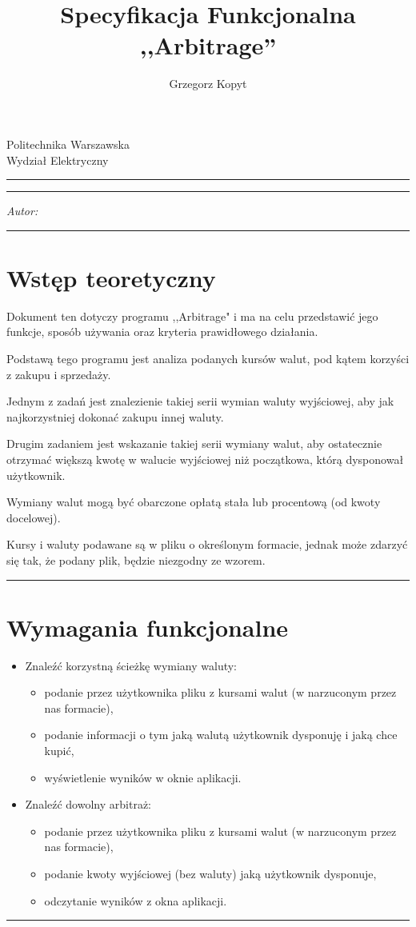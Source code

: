 \documentclass[a4paper,11pt]{article}
\author{Grzegorz Kopyt}
\title{Specyfikacja Funkcjonalna \\
,,Arbitrage''}
\makeatletter
\newcommand{\linia}{\rule{\linewidth}{0.4mm}}
\renewcommand{\maketitle}{\begin{titlepage}
    \vspace*{2cm}
    \begin{center}\LARGE
    Politechnika Warszawska\\
    Wydział Elektryczny\\
    \end{center}
    \vspace{5cm}
    \noindent\linia
    \begin{center}
      \LARGE \textsc{\@title}
         \end{center}
     \linia
    \vspace{0.5cm}
    \begin{flushright}
    \begin{minipage}{5cm}
    \textit{Autor:}\\
    \normalsize \textsc{\@author} \par
    \end{minipage}
    \vspace{5cm}
     \end{flushright}
    \vspace*{\stretch{6}}
    \begin{center}
    \@date
    \end{center}
  \end{titlepage}
}
\makeatother
\begin{document}
\maketitle

\tableofcontents
\vspace{1cm}
\noindent\linia
\section{Wstęp teoretyczny}

\qquad Dokument ten dotyczy programu ,,Arbitrage" i ma na celu przedstawić jego funkcje, sposób używania oraz kryteria prawidłowego działania.

Podstawą tego programu jest analiza podanych kursów walut, pod kątem korzyści z zakupu i sprzedaży.

Jednym z zadań jest znalezienie takiej serii wymian waluty wyjściowej, aby jak najkorzystniej dokonać zakupu innej waluty.

Drugim zadaniem jest wskazanie takiej serii wymiany walut, aby ostatecznie otrzymać większą kwotę w walucie wyjściowej niż początkowa, którą dysponował użytkownik.

Wymiany walut mogą być obarczone opłatą stała lub procentową (od kwoty docelowej).

Kursy i waluty podawane są w pliku o określonym formacie, jednak może zdarzyć się tak, że podany plik, będzie niezgodny ze wzorem.

\noindent\linia
\section{Wymagania funkcjonalne}
\begin{itemize}
\item Znaleźć korzystną ścieżkę wymiany waluty:
\begin{itemize}
\item podanie przez użytkownika pliku z kursami walut (w narzuconym przez nas formacie),
\item podanie informacji o tym jaką walutą użytkownik dysponuję  i jaką chce kupić,
\item wyświetlenie wyników w oknie aplikacji.
\end{itemize}
\item Znaleźć dowolny arbitraż:
\begin{itemize}
\item podanie przez użytkownika pliku z kursami walut (w narzuconym przez nas formacie),
\item podanie kwoty wyjściowej (bez waluty) jaką użytkownik dysponuje,
\item odczytanie wyników z okna aplikacji.
\end{itemize}
\end{itemize}
\noindent\linia
\newpage
\end{document}
